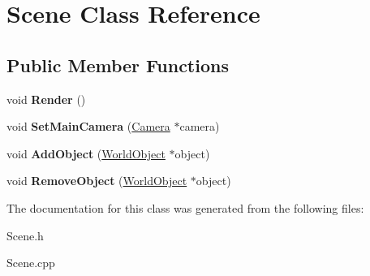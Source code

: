 \hypertarget{class_scene}{\section{Scene Class Reference}
\label{class_scene}
}
\subsection*{Public Member Functions}
\begin{DoxyCompactItemize}
\item 
\hypertarget{class_scene_a91913b921d41d374e00eac347358dc14}{void {\bfseries Render} ()}\label{class_scene_a91913b921d41d374e00eac347358dc14}

\item 
\hypertarget{class_scene_ac6ad6931a0fcbba7bdb60c105dbb9af2}{void {\bfseries Set\+Main\+Camera} (\hyperlink{class_camera}{Camera} $\ast$camera)}\label{class_scene_ac6ad6931a0fcbba7bdb60c105dbb9af2}

\item 
\hypertarget{class_scene_ac395fac38291f84eaf6cffd8458e6d95}{void {\bfseries Add\+Object} (\hyperlink{class_world_object}{World\+Object} $\ast$object)}\label{class_scene_ac395fac38291f84eaf6cffd8458e6d95}

\item 
\hypertarget{class_scene_ac0f05dc45b2bcec9f41f45ce79305116}{void {\bfseries Remove\+Object} (\hyperlink{class_world_object}{World\+Object} $\ast$object)}\label{class_scene_ac0f05dc45b2bcec9f41f45ce79305116}

\end{DoxyCompactItemize}


The documentation for this class was generated from the following files\+:\begin{DoxyCompactItemize}
\item 
Scene.\+h\item 
Scene.\+cpp\end{DoxyCompactItemize}
